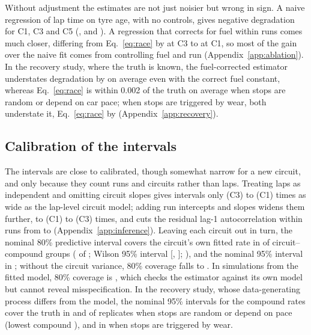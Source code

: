 Without adjustment the estimates are not just noisier but wrong in sign.
A naive regression of lap time on tyre age, with no controls, gives negative degradation for C1, C3 and C5 (\NaiveCOne, \NaiveCThree{} and \NaiveCFive\spl).
A regression that corrects for fuel within runs comes much closer, differing from Eq.~\eqref{eq:race} by \AblGapCThree\spl{} at C3 to \AblGapCOne\spl{} at C1, so most of the gain over the naive fit comes from controlling fuel and run (Appendix~\ref{app:ablation}).
In the recovery study, where the truth is known, the fuel-corrected estimator understates degradation by \RecFuelExoBiasAbs\spl{} on average even with the correct fuel constant, whereas Eq.~\eqref{eq:race} is within 0.002\spl{} of the truth on average when stops are random or depend on car pace; when stops are triggered by wear, both understate it, Eq.~\eqref{eq:race} by \RecExactWearBiasAbs\spl{} (Appendix~\ref{app:recovery}).

\subsection{Calibration of the intervals}\label{sec:calib}

The intervals are close to calibrated, though somewhat narrow for a new circuit, and only because they count runs and circuits rather than laps.
Treating laps as independent and omitting circuit slopes gives intervals only \WidthNoCircuitCThree{} (C3) to \WidthNoCircuitCOne{} (C1) times as wide as the lap-level circuit model; adding run intercepts and slopes widens them further, to \WidthShippedCOne{} (C1) to \WidthShippedCThree{} (C3) times, and cuts the residual lag-1 autocorrelation within runs from \LagOneCircuitModel{} to \LagOneShipped{} (Appendix~\ref{app:inference}).
Leaving each circuit out in turn, the nominal 80\% predictive interval covers the circuit's own fitted rate in \CovEightyLOCO{} of \CovEightyN{} circuit--compound groups (\CovEightyK{} of \CovEightyN{}; Wilson 95\% interval [\CovEightyWilsonLo, \CovEightyWilsonHi]; \citealp{brown2001interval}), and the nominal 95\% interval in \CovNinetyFiveLOCO; without the circuit variance, 80\% coverage falls to \CovEightyNoCircuit.
In simulations from the fitted model, 80\% coverage is \CovEightySBC, which checks the estimator against its own model but cannot reveal misspecification.
In the recovery study, whose data-generating process differs from the model, the nominal 95\% intervals for the compound rates cover the truth in \RecExactExoCov{} and \RecExactPaceCov{} of replicates when stops are random or depend on pace (lowest compound \RecExactPaceWorstCov), and in \RecExactWearCov{} when stops are triggered by wear.

